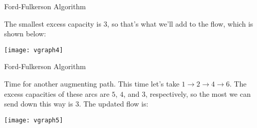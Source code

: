 \begin{frame}[fragile]{Ford-Fulkerson Algorithm}

The smallest excess capacity is $3$, so that's what we'll add to the flow, which is shown below:

\begin{center}
\texttt{[image: vgraph4]}
\end{center}


\end{frame}
\begin{frame}[fragile]{Ford-Fulkerson Algorithm}

Time for another augmenting path.  This time let's take $1\rightarrow 2\rightarrow 4\rightarrow 6$.  The excess capacities of these arcs are $5$, $4$, and $3$, respectively, so the most we can send down this way is $3$.  The updated flow is:

\begin{center}
\texttt{[image: vgraph5]}
\end{center}

\end{frame}
